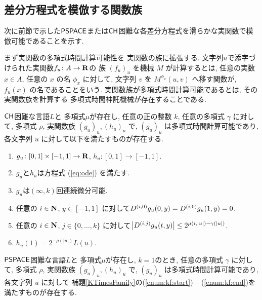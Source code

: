 \subsection{差分方程式を模倣する関数族}
\label{subsection: ode family}
次に前節で示した$\mathsf{PSPACE}$または$\mathsf{CH}$困難な各差分方程式を滑らかな実関数で模倣可能であることを示す.

まず実関数の多項式時間計算可能性を
実関数の族に拡張する.
文字列$u$で添字づけられた実関数$f _u \colon A \to \mathbf R$の
族 $(f_u)_u$ を機械 $M$ が計算するとは,
任意の実数 $x \in A$, 任意の $x$ の名 $\phi_x$ に対して,
文字列 $v$ を $M ^{\phi _x} (u, v)$ へ移す関数が, 
$f _u (x)$ の名であることをいう.
実関数族が多項式時間計算可能であるとは, その実関数族を計算する
多項式時間神託機械が存在することである.

 \begin{lemma}
  \label{KTimesFamily}
  $\mathsf{CH}$困難な言語$L$と
  多項式$\mu$が存在し,
  任意の正の整数 $k$,
  任意の多項式 $\gamma$ に対して,
  多項式 $\rho$, 実関数族 $(g_u)_u, (h_u)_u$ で, 
  $(g_u)_u$ は多項式時間計算可能であり,
  各文字列 $u$ に対して以下を満たすものが存在する.

  \begin{enumerate}
   \item \label{enum:kf:start}
     $g_u\colon [0,1] \times [-1,1]\to \mathbf R$, $h_u\colon [0,1] \to [-1,1]$. 
   \item \label{enum:equation}
         $g_u$と$h_u$は方程式 (\ref{eq:ode}) を満たす.
   \item \label{enum:differentiability}
         $g_u$は$(\infty, k)$回連続微分可能.
   \item \label{enum:boundary}
	 任意の $i \in \mathbf N$, $y \in [-1,1]$ に対して$
	  D^{(i, 0)} g_u(0,y) = D^{(i, 0)} g_u(1,y) = 0
         $.
   \item \label{enum:smooth}
	 任意の $i \in \mathbf N$, $j \in \{0, \dots, k\}$ に対して$
	  \left|D^{(i,j)} g_u(t,y)\right| \le 2^{\mu(i, |u|) - \gamma(|u|)}
         $.
   \item \label{enum:kf:end}
	 $h_u(1) = 2^{-\rho(|u|)} L(u)$.
  \end{enumerate}
 \end{lemma}

\begin{lemma}
 \label{DifferentiableFamily}
 $\mathsf{PSPACE}$困難な言語$L$と
 多項式$\mu$が存在し, 
 $k = 1$のとき,
 任意の多項式 $\gamma$ に対して,
 多項式 $\rho$, 実関数族 $(g_u)_u, (h_u)_u$ で, 
 $(g_u)_u$ は多項式時間計算可能であり,
 各文字列 $u$ に対して
 補題\ref{KTimesFamily}の(\ref{enum:kf:start}) -- (\ref{enum:kf:end})を満たすものが存在する.
\end{lemma}



